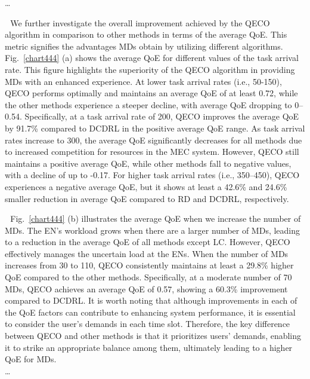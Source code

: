 \documentclass[12pt,draftclsnofoot,onecolumn]{IEEEtran}
\newenvironment{my}[2]%
{\begin{list}{}%
{\setlength{\rightmargin}{#1}\setlength{\leftmargin}{#2}}%


 \item[]{}

} {\end{list}}
\begin{document}
\begin{enumerate}
\begin{my}{1cm}{1cm}
{{			\dots 
			
			\,\,\,\,We further investigate the overall improvement achieved by the QECO algorithm in comparison to other methods in terms of the average QoE. This metric signifies the advantages MDs obtain by utilizing different algorithms. Fig.~\ref{chart444} (a) shows the average QoE for different values of the task arrival rate. This figure highlights the superiority of the QECO algorithm in providing MDs with an enhanced experience. At lower task arrival rates (i.e., 50-150), QECO performs optimally and maintains an average QoE of at least 0.72, while the other methods experience a steeper decline, with average QoE dropping to 0--0.54. Specifically, at a task arrival rate of 200, QECO improves the average QoE by 91.7\% compared to DCDRL in the positive average QoE range. As task arrival rates increase to 300, the average QoE significantly decreases for all methods due to increased competition for resources in the MEC system. However, QECO still maintains a positive average QoE, while other methods fall to negative values, with a decline of up to -0.17. For higher task arrival rates (i.e., 350–450), QECO experiences a negative average QoE, but it shows at least a 42.6\% and 24.6\% smaller reduction in average QoE compared to RD and DCDRL, respectively. \vspace{3mm}
			
			
			
			\,\,\,\,Fig.~\ref{chart444} (b) illustrates the average QoE when we increase the number of MDs. The EN's workload grows when there are a larger number of MDs, leading to a reduction in the average QoE of all methods except LC. However, QECO effectively manages the uncertain load at the ENs. When the number of MDs increases from 30 to 110, QECO consistently maintains at least a 29.8\% higher QoE compared to the other methods. Specifically, at a moderate number of 70 MDs, QECO achieves an average QoE of 0.57, showing a 60.3\% improvement compared to DCDRL. It is worth noting that although improvements in each of the QoE factors can contribute to enhancing system performance, it is essential to consider the user's demands in each time slot. Therefore, the key difference between QECO and other methods is that it prioritizes users' demands, enabling it to strike an appropriate balance among them, ultimately leading to a higher QoE for MDs. \vspace{3mm}\\\dots }}
	
\end{my}\vspace{6mm}
	



\end{enumerate}
\end{document}
